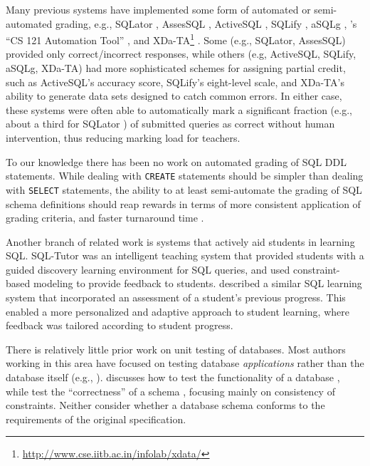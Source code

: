 \documentclass[sigconf, authordraft, capitalise]{acmart}
\begin{document}
Many previous systems have implemented some form of automated or semi-automated grading, e.g., SQLator \cite{Sadiq.S-2004a-SQLator}, AssesSQL \cite{Prior.J-2004a-Backwash}, ActiveSQL \cite{Russell.G-2004a-Improving,Russell.G-2005a-Online}, SQLify \cite{Dekeyser.S-2007a-Computer}, aSQLg \cite{Kleiner.C-2013a-Automated}, \citeauthor{Gong.A-2015a-CS-121-Automation}'s ``CS 121 Automation Tool'' \cite{Gong.A-2015a-CS-121-Automation}, and XDa-TA\footnote{\url{http://www.cse.iitb.ac.in/infolab/xdata/}} \cite{Bhangdiya.A-2015a-XDa-TA,Chandra.B-2015a-Data,Chandra.B-2016a-Partial}. Some (e.g., SQLator, AssesSQL) provided only correct/incorrect responses, while others (e.g, ActiveSQL, SQLify, aSQLg, XDa-TA) had more sophisticated schemes for assigning partial credit, such as ActiveSQL's accuracy score, SQLify's eight-level scale, and XDa-TA's ability to generate data sets designed to catch common errors. In either case, these systems were often able to automatically mark a significant fraction (e.g., about a third for SQLator \cite{Sadiq.S-2004a-SQLator}) of submitted queries as correct without human intervention, thus reducing marking load for teachers.

To our knowledge there has been no work on automated grading of SQL DDL statements. While dealing with \texttt{CREATE} statements should be simpler than dealing with \texttt{SELECT} statements, the ability to at least semi-automate the grading of SQL schema definitions should reap rewards in terms of more consistent application of grading criteria, and faster turnaround time \cite{Douce.C-2005a-Automatic,Russell.G-2004a-Improving,Dekeyser.S-2007a-Computer,Prior.J-2004a-Backwash}.

Another branch of related work is systems that actively aid students in learning SQL. SQL-Tutor \cite{Mitrovic.A-1998a-Learning} was an intelligent teaching system that provided students with a guided discovery learning environment for SQL queries, and used constraint-based modeling \cite{Ohlsson.S-1992a-Constraint-based,Ohlsson.S-2016a-Constraint-based} to provide feedback to students. \citeauthor{Kenny.C-2005a-Automated} \cite{Kenny.C-2005a-Automated} described a similar SQL learning system that incorporated an assessment of a student's previous progress. This enabled a more personalized and adaptive approach to student learning, where feedback was tailored according to student progress.

There is relatively little prior work on unit testing of databases. Most authors working in this area have focused on testing database \emph{applications} rather than the database itself (e.g., \cite{Binnig.C-2008a-Multi-RQP,Chays.D-2008a-Query-based,Marcozzi.M-2012a-Test,Haller.K-2010a-Test}). \citeauthor{Ambler.S-2006a-Database} discusses how to test the functionality of a database \cite{Ambler.S-2006a-Database}, while \citeauthor{Farre.C-2008a-SVTe} test the ``correctness'' of a schema \cite{Farre.C-2008a-SVTe}, focusing mainly on consistency of constraints. Neither consider whether a database schema conforms to the requirements of the original specification.
\end{document}
